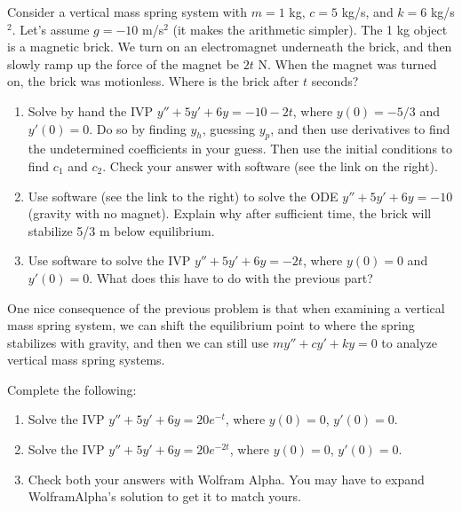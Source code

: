 \begin{problem}
 Consider a vertical mass spring system with $m=1$ kg, $c=5$ kg/s, and $k=6$ kg/s$^2$. Let's assume $g=-10$ m/s$^2$ (it makes the arithmetic simpler).   The 1 kg object is a magnetic brick. We turn on an electromagnet underneath the brick, and then slowly ramp up the force of the magnet be $2t$ N. When the magnet was turned on, the brick was motionless. Where is the brick after $t$ seconds?
\begin{enumerate}
 \item Solve by hand the IVP $y''+5y'+6y=-10-2t$, where $y(0)=-5/3$ and $y'(0)=0$. Do so by finding $y_h$, guessing $y_p$, and then use derivatives to find the undetermined coefficients in your guess. Then use the initial conditions to find $c_1$ and $c_2$. Check your answer with software (see the link on the right). 
 \item Use software (see the link to the right) to solve the ODE $y''+5y'+6y=-10$ (gravity with no magnet). Explain why after sufficient time, the brick will stabilize 5/3 m below equilibrium. 
 \item Use software to solve the IVP $y''+5y'+6y=-2t$, where $y(0)=0$ and $y'(0)=0$. What does this have to do with the previous part?
\end{enumerate}
\end{problem}

One nice consequence of the previous problem is that when examining a vertical mass spring system, we can shift the equilibrium point to where the spring stabilizes with gravity, and then we can still use $my''+cy'+ky=0$ to analyze vertical mass spring systems.  



\begin{problem}
 Complete the following:
\begin{enumerate}
 \item Solve the IVP $y''+5y'+6y=20 e^{-t}$, where $y(0)=0$, $y'(0)=0$. 
 \item Solve the IVP $y''+5y'+6y=20 e^{-2t}$, where $y(0)=0$, $y'(0)=0$. 
 \item Check both your answers with Wolfram Alpha. You may have to expand WolframAlpha's solution to get it to match yours.
\end{enumerate}
\end{problem}

